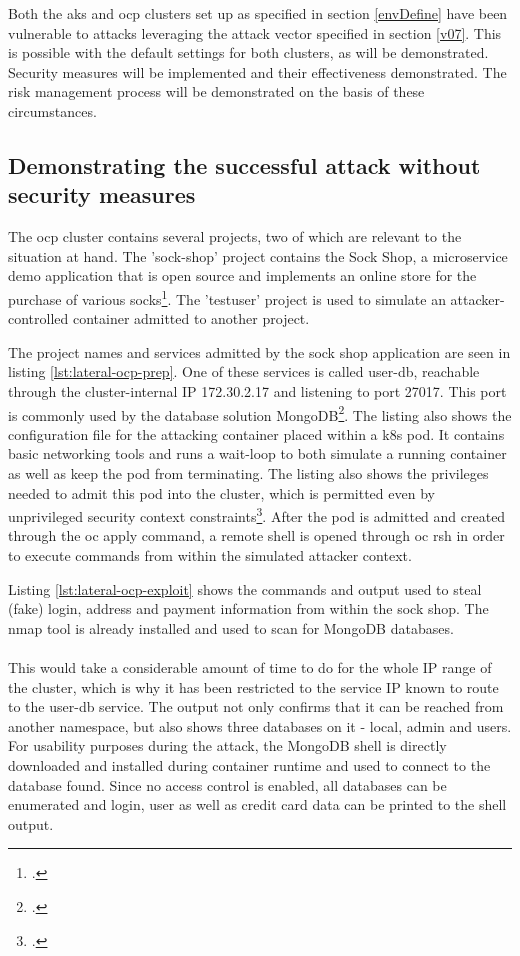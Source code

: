 Both the \gls{aks} and \gls{ocp} clusters set up as specified in section \ref{envDefine} have been vulnerable to attacks leveraging the attack vector specified in section \ref{v07}. This is possible with the default settings for both clusters, as will be demonstrated. Security measures will be implemented and their effectiveness demonstrated. The risk management process will be demonstrated on the basis of these circumstances.

\subsection{Demonstrating the successful attack without security measures}
The \gls{ocp} cluster contains several projects, two of which are relevant to the situation at hand. 
The 'sock-shop' project contains the Sock Shop, a microservice demo application that is open source and implements an online store for the purchase of various socks\footcite[][, first paragraph of 'README.md']{sockShop}.
The 'testuser' project is used to simulate an attacker-controlled container admitted to another project.

The project names and  services admitted by the sock shop application are seen in listing \ref{lst:lateral-ocp-prep}. One of these services is called user-db, reachable through the cluster-internal IP 172.30.2.17 and listening to port 27017. This port is commonly used by the database solution MongoDB\footcite[][, first table row]{mongoPort}. The listing also shows the configuration file for the attacking container placed within a \gls{k8s} pod. It contains basic networking tools and runs a wait-loop to both simulate a running container as well as keep the pod from terminating. The listing also shows the privileges needed to admit this pod into the cluster, which is permitted even by unprivileged security context constraints\footcite[][, refer to table of section 'Listing Security Context Constraints']{sccDefaults}. After the pod is admitted and created through the oc apply command, a remote shell is opened through oc rsh in order to execute commands from within the simulated attacker context.

Listing \ref{lst:lateral-ocp-exploit} shows the commands and output used to steal (fake) login, address and payment information from within the sock shop.
The nmap tool is already installed and used to scan for MongoDB databases. \\
\\
This would take a considerable amount of time to do for the whole IP range of the cluster, which is why it has been restricted to the service IP known to route to the user-db service. The output not only confirms that it can be reached from another namespace, but also shows three databases on it - local, admin and users.
For usability purposes during the attack, the MongoDB shell is directly downloaded and installed during container runtime and used to connect to the database found. Since no access control is enabled, all databases can be enumerated and login, user as well as credit card data can be printed to the shell output.

